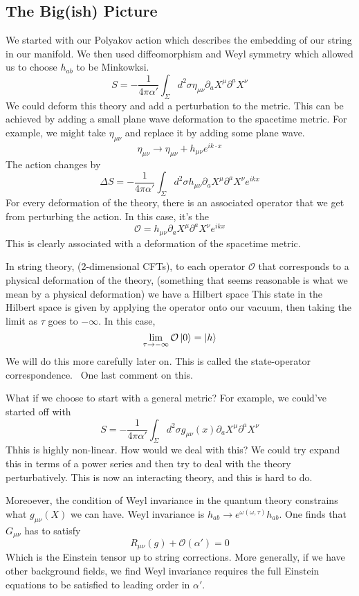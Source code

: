 \documentclass[11pt, oneside]{article}   	%
\theoremstyle{slanted}
\begin{document}
\subsection{The Big(ish) Picture}
We started with our Polyakov action 
which describes the embedding of our string in our manifold. 
We then used diffeomorphism and Weyl symmetry 
which allowed us to choose $ h _{ ab } $ to be Minkowksi. 
\[
 S  = -\frac{1}{4 \pi \alpha ' } \int_{ \Sigma } d ^2 \sigma \eta _{ \mu \nu } \partial  _ a X ^ \mu 
 \partial  ^ a X ^ \nu 
\] We could deform this 
theory and add a perturbation to the metric. 
This can be achieved by adding a 
small plane wave deformation to the spacetime 
metric.
For example, we might take 
$ \eta _{ \mu \nu } $ and replace it 
by adding some plane wave. 
\[
 \eta _{ \mu \nu } \to \eta _{ \mu \nu } + h _{ \mu \nu  } e ^{ i k \cdot  x } 
\] 
The action changes by 
\[
 \Delta S  =  - \frac{1}{4 \pi \alpha ' } \int_{ \Sigma } d ^ 2 \sigma 
 h _{ \mu \nu } \partial  _ a X ^ \mu \partial  ^ a X ^ \nu e ^{ ikx } 
\] 
For every deformation of the theory, 
there is an associated operator that 
we get from perturbing the action. 
In this case, it's the 
\[
 \mathcal{ O }  = h _{ \mu \nu } \partial  _ a X ^ \mu \partial  ^ a X ^ \nu e ^{ ikx  }
\] This is clearly associated with a 
deformation of the spacetime metric. 

In string theory, (2-dimensional CFTs), 
to each operator $ \mathcal{ O } $ that 
corresponds to a physical deformation 
of the theory, (something that seems reasonable 
is what we mean by a physical deformation)
we have a Hilbert space
This state in the Hilbert space is given 
by applying the operator onto our vacuum, 
then taking the limit as $ \tau $ goes to $  - \infty$. 
In this case, 
\[
 \lim_{ \tau \to  - \infty } \mathcal{ O } \ket{ 0 }  = \ket{ h } 
\] We will 
do this more carefully later on. 
This is called the state-operator correspondence. 
One last comment on this. 

What if we choose to start with a general metric?
For example, we could've started off with 
\[
 S  =  - \frac{1}{4 \pi \alpha '  } \int _{ \Sigma } d ^ 2 \sigma 
 g _{ \mu \nu } \left( x  \right)  \partial  _ a X^ \mu \partial  ^a X ^ \nu 
\]  Thhis is highly non-linear. 
How would we deal with this? 
We could try expand this in terms of a power series 
and then try to deal with the theory perturbatively.
This is now an interacting theory, 
and this is hard to do.

Moreoever, the condition of Weyl invariance 
in the quantum theory constrains what $ g _{ \mu \nu }\left( X  \right)   $ 
we can have. 
Weyl invariance is $ h _{ ab } \to e^{ \omega \left( \omega, \tau  \right)  } h _{ ab } $.
One finds that $ G _{ \mu \nu } $ has to satisfy 
\[
	R _{ \mu \nu } \left( g  \right)  + \mathcal{ O } \left( \alpha '   \right)   =0 
\] Which is the Einstein 
tensor up to string corrections. 
More generally, if we have other 
background fields, 
we find Weyl invariance requires 
the full Einstein equations to be satisfied to 
leading order in $ \alpha ' $.
\end{document}
